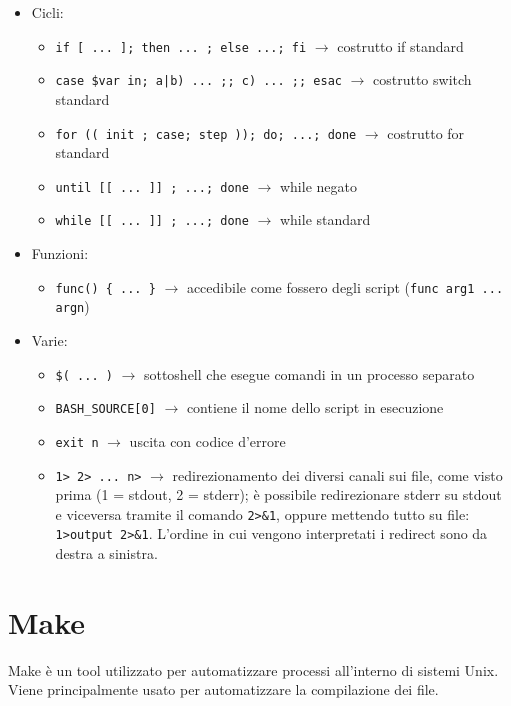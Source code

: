 \documentclass[a4paper]{article}
\begin{document}
\begin{itemize}
\item Cicli:
\begin{itemize}
\item\verb|if [ ... ]; then ... ; else ...; fi| $\rightarrow$ costrutto if standard
\item\verb=case $var in; a|b) ... ;; c) ... ;; esac= $\rightarrow$ costrutto switch standard
\item\verb|for (( init ; case; step )); do; ...; done| $\rightarrow$ costrutto for standard
\item\verb|until [[ ... ]] ; ...; done| $\rightarrow$ while negato
\item\verb|while [[ ... ]] ; ...; done| $\rightarrow$ while standard
\end{itemize}

\item Funzioni:
\begin{itemize}
\item\verb|func() { ... }| $\rightarrow$ accedibile come fossero degli script (\verb|func arg1 ... argn|)
\end{itemize}

\item Varie:
\begin{itemize}
\item\verb|$( ... )| $\rightarrow$ sottoshell che esegue comandi in un processo separato
\item\verb|BASH_SOURCE[0]| $\rightarrow$ contiene il nome dello script in esecuzione
\item\verb|exit n| $\rightarrow$ uscita con codice d'errore
\item\verb|1> 2> ... n>| $\rightarrow$ redirezionamento dei diversi canali sui file, come visto prima (1 = stdout, 2 = stderr); è possibile redirezionare stderr su stdout e viceversa tramite il comando \verb|2>&1|, oppure mettendo tutto su file: \verb|1>output 2>&1|. L'ordine in cui vengono interpretati i redirect sono da destra a sinistra.
\end{itemize}
\end{itemize}

\section{Make}

Make è un tool utilizzato per automatizzare processi all'interno di sistemi Unix. Viene principalmente usato per automatizzare la compilazione dei file.
\end{document}
